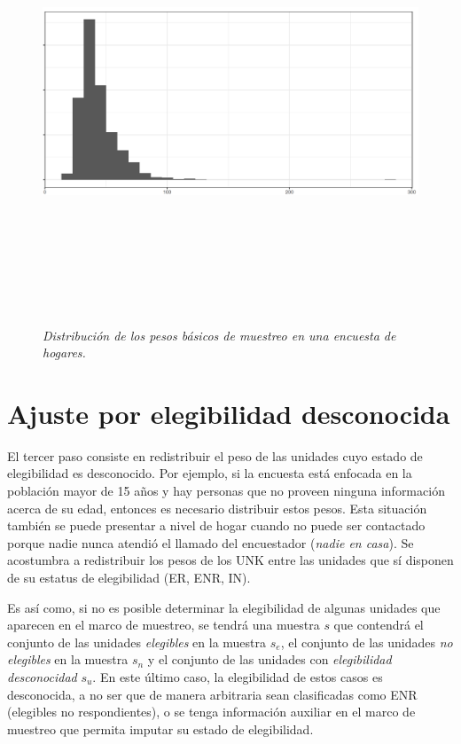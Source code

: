 \documentclass[
  10pt,
  spanish,
]{book}
\begin{document}
\begin{figure}
\centering
\includegraphics[width=\textwidth,height=5.20833in]{Pics/15.png}
\caption{\emph{Distribución de los pesos básicos de muestreo en una encuesta de hogares.}}
\end{figure}

\hypertarget{ajuste-por-elegibilidad-desconocida}{%
\section{Ajuste por elegibilidad desconocida}\label{ajuste-por-elegibilidad-desconocida}}

El tercer paso consiste en redistribuir el peso de las unidades cuyo estado de elegibilidad es desconocido. Por ejemplo, si la encuesta está enfocada en la población mayor de 15 años y hay personas que no proveen ninguna información acerca de su edad, entonces es necesario distribuir estos pesos. Esta situación también se puede presentar a nivel de hogar cuando no puede ser contactado porque nadie nunca atendió el llamado del encuestador (\emph{nadie en casa}). Se acostumbra a redistribuir los pesos de los UNK entre las unidades que sí disponen de su estatus de elegibilidad (ER, ENR, IN).

Es así como, si no es posible determinar la elegibilidad de algunas unidades que aparecen en el marco de muestreo, se tendrá una muestra \(s\) que contendrá el conjunto de las unidades \emph{elegibles} en la muestra \(s_{e}\), el conjunto de las unidades \emph{no elegibles} en la muestra \(s_{n}\) y el conjunto de las unidades con \emph{elegibilidad desconocidad} \(s_{u}\). En este último caso, la elegibilidad de estos casos es desconocida, a no ser que de manera arbitraria sean clasificadas como ENR (elegibles no respondientes), o se tenga información auxiliar en el marco de muestreo que permita imputar su estado de elegibilidad.
\end{document}

